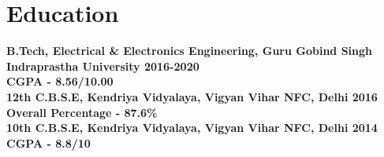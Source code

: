 \documentclass[10pt]{report}
\begin{document}
\section*{\color{BlueViolet}\faBook\hspace{1pt} Education} %
\textbf{B.Tech, Electrical \& Electronics Engineering, Guru Gobind Singh Indraprastha University
\hfill 2016-2020}\\
\textbf{CGPA - 8.56/10.00}\vspace{10pt}
\\
\textbf{12th C.B.S.E, Kendriya Vidyalaya, Vigyan Vihar NFC, Delhi
\hfill 2016}\\
\textbf{Overall Percentage - 87.6\%}\vspace{10pt}
\\
\textbf{10th C.B.S.E, Kendriya Vidyalaya, Vigyan Vihar NFC, Delhi
\hfill 2014}\\
\textbf{CGPA - 8.8/10}

\end{document}
